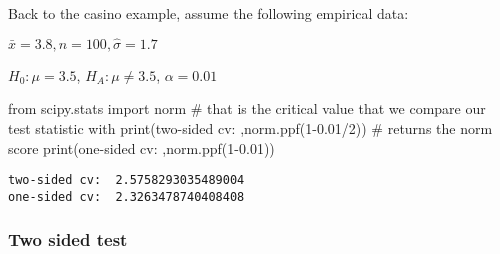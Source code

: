 \documentclass[
  letterpaper,
  DIV=11,
  numbers=noendperiod]{scrreprt}
\newenvironment{Shaded}{\begin{snugshade}}{\end{snugshade}}
\newcommand{\BuiltInTok}[1]{\textcolor[rgb]{0.00,0.23,0.31}{#1}}
\newcommand{\CommentTok}[1]{\textcolor[rgb]{0.37,0.37,0.37}{#1}}
\newcommand{\DecValTok}[1]{\textcolor[rgb]{0.68,0.00,0.00}{#1}}
\newcommand{\FloatTok}[1]{\textcolor[rgb]{0.68,0.00,0.00}{#1}}
\newcommand{\ImportTok}[1]{\textcolor[rgb]{0.00,0.46,0.62}{#1}}
\newcommand{\NormalTok}[1]{\textcolor[rgb]{0.00,0.23,0.31}{#1}}
\newcommand{\OperatorTok}[1]{\textcolor[rgb]{0.37,0.37,0.37}{#1}}
\newcommand{\StringTok}[1]{\textcolor[rgb]{0.13,0.47,0.30}{#1}}
\begin{document}
Back to the casino example, assume the following empirical data:

\(\bar{x} = 3.8, n = 100, \hat{\sigma} = 1.7\)

\(H_0: \mu = 3.5\), \(H_A: \mu \neq 3.5\), \(\alpha = 0.01\)

\begin{Shaded}
\begin{Highlighting}[]
\ImportTok{from}\NormalTok{ scipy.stats }\ImportTok{import}\NormalTok{ norm}
\CommentTok{\# that is the critical value that we compare our test statistic with}
\BuiltInTok{print}\NormalTok{(}\StringTok{\textquotesingle{}two{-}sided cv: \textquotesingle{}}\NormalTok{,norm.ppf(}\DecValTok{1}\OperatorTok{{-}}\FloatTok{0.01}\OperatorTok{/}\DecValTok{2}\NormalTok{)) }\CommentTok{\# returns the norm score}
\BuiltInTok{print}\NormalTok{(}\StringTok{\textquotesingle{}one{-}sided cv: \textquotesingle{}}\NormalTok{,norm.ppf(}\DecValTok{1}\OperatorTok{{-}}\FloatTok{0.01}\NormalTok{))}
\end{Highlighting}
\end{Shaded}

\begin{verbatim}
two-sided cv:  2.5758293035489004
one-sided cv:  2.3263478740408408
\end{verbatim}

\hypertarget{two-sided-test}{%
\subsubsection{Two sided test}\label{two-sided-test}}
\end{document}
